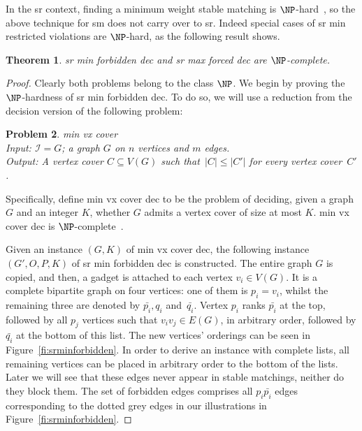 \documentclass[preprint,12pt]{elsarticle}
\newtheorem{theorem}{Theorem}[section]
\newtheorem{pr}[theorem]{Problem}
\begin{document}
In the {\sc sr} context, finding a minimum weight stable matching is $\NP$-hard~\cite{Fed92}, so the above technique for {\sc sm} does not carry over to {\sc sr}. Indeed special cases of {\sc sr min restricted violations} are $\NP$-hard, as the following result shows.

\begin{theorem}
\label{th:sr_min_forbidden}
	{\sc sr min forbidden dec} and {\sc sr max forced dec} are $\NP$-complete.
\end{theorem}
\begin{proof}	
Clearly both problems belong to the class $\NP$.  We begin by proving the $\NP$-hardness of {\sc sr min forbidden dec}.  To do so, we will use a reduction from the decision version of the following problem:
\begin{pr} {\sc min vx cover} \ \\
	Input: $\mathcal{I} = G$; a graph $G$ on $n$ vertices and $m$ edges.\\
	Output: A vertex cover $C \subseteq V(G)$ such that~$|C| \leq |C'|$ for every vertex cover~$C'$.
\end{pr}
\noindent Specifically, define {\sc min vx cover dec} to be the problem of deciding, given a graph $G$ and an integer $K$, whether $G$ admits a vertex cover of size at most $K$.  {\sc min vx cover dec} is $\NP$-complete~\cite{GJ79}.



Given an instance $(G, K)$ of {\sc min vx cover dec}, the following instance $(G', O, P, K)$ of {\sc sr min forbidden dec} is constructed. The entire graph $G$ is copied, and then, a gadget is attached to each vertex $v_i \in V(G)$. It is a complete bipartite graph on four vertices: one of them is $p_i = v_i$, whilst the remaining three are denoted by  $\bar{p_i}, q_i$ and~$\bar{q_i}$. Vertex $p_i$ ranks $\bar{p_i}$ at the top, followed by all $p_j$ vertices such that $v_iv_j\in E(G)$, in arbitrary order, followed by $\bar{q_i}$ at the bottom of this list. The new vertices' orderings can be seen in Figure~\ref{fi:srminforbidden}. In order to derive an instance with complete lists, all remaining vertices can be placed in arbitrary order to the bottom of the lists. Later we will see that these edges never appear in stable matchings, neither do they block them. The set of forbidden edges comprises all $p_i\bar{p_i}$ edges corresponding to the dotted grey edges in our illustrations in Figure~\ref{fi:srminforbidden}.


\end{proof}
\end{document}
